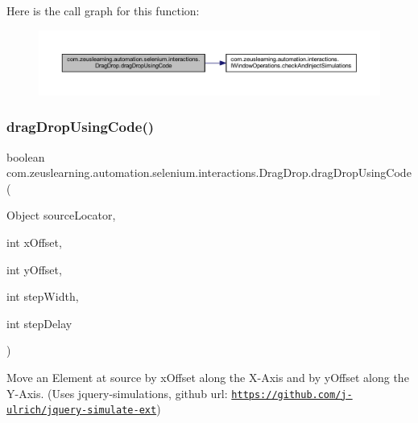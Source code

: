 Here is the call graph for this function\+:
\nopagebreak
\begin{figure}[H]
\begin{center}
\leavevmode
\includegraphics[width=350pt]{d3/d41/classcom_1_1zeuslearning_1_1automation_1_1selenium_1_1interactions_1_1DragDrop_a02c5aee5ea424d0c247bff0c7e76dd97_cgraph}
\end{center}
\end{figure}
\hypertarget{classcom_1_1zeuslearning_1_1automation_1_1selenium_1_1interactions_1_1DragDrop_aa18fc7ffdb0ac0a5fe1c2772409fed7c}{}\label{classcom_1_1zeuslearning_1_1automation_1_1selenium_1_1interactions_1_1DragDrop_aa18fc7ffdb0ac0a5fe1c2772409fed7c} 
\subsubsection{\texorpdfstring{drag\+Drop\+Using\+Code()}{dragDropUsingCode()}\hspace{0.1cm}{\footnotesize\ttfamily [3/3]}}
{\footnotesize\ttfamily boolean com.\+zeuslearning.\+automation.\+selenium.\+interactions.\+Drag\+Drop.\+drag\+Drop\+Using\+Code (\begin{DoxyParamCaption}\item[{Object}]{source\+Locator,  }\item[{int}]{x\+Offset,  }\item[{int}]{y\+Offset,  }\item[{int}]{step\+Width,  }\item[{int}]{step\+Delay }\end{DoxyParamCaption})\hspace{0.3cm}{\ttfamily [inline]}}

Move an Element at {\ttfamily source} by {\ttfamily x\+Offset} along the X-\/\+Axis and by {\ttfamily y\+Offset} along the Y-\/\+Axis. (Uses jquery-\/simulations, github url\+: \href{https://github.com/j-ulrich/jquery-simulate-ext}{\tt https\+://github.\+com/j-\/ulrich/jquery-\/simulate-\/ext})


